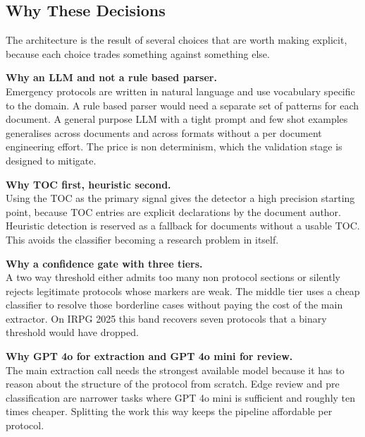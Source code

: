 \documentclass{article}
\begin{document}
\subsection{Why These Decisions}

The architecture is the result of several choices that are worth
making explicit, because each choice trades something against
something else.

\begin{conceptbox}
\textbf{Why an LLM and not a rule based parser.}\\
Emergency protocols are written in natural language and use vocabulary
specific to the domain. A rule based parser would need a separate set
of patterns for each document. A general purpose LLM with a tight
prompt and few shot examples generalises across documents and across
formats without a per document engineering effort. The price is non
determinism, which the validation stage is designed to mitigate.
\end{conceptbox}

\begin{conceptbox}
\textbf{Why TOC first, heuristic second.}\\
Using the TOC as the primary signal gives the detector a high
precision starting point, because TOC entries are explicit
declarations by the document author. Heuristic detection is reserved
as a fallback for documents without a usable TOC. This avoids the
classifier becoming a research problem in itself.
\end{conceptbox}

\begin{conceptbox}
\textbf{Why a confidence gate with three tiers.}\\
A two way threshold either admits too many non protocol sections or
silently rejects legitimate protocols whose markers are weak. The
middle tier uses a cheap classifier to resolve those borderline cases
without paying the cost of the main extractor. On IRPG 2025 this band
recovers seven protocols that a binary threshold would have dropped.
\end{conceptbox}

\begin{conceptbox}
\textbf{Why GPT 4o for extraction and GPT 4o mini for review.}\\
The main extraction call needs the strongest available model because
it has to reason about the structure of the protocol from scratch.
Edge review and pre classification are narrower tasks where GPT 4o
mini is sufficient and roughly ten times cheaper. Splitting the work
this way keeps the pipeline affordable per protocol.
\end{conceptbox}
\end{document}
